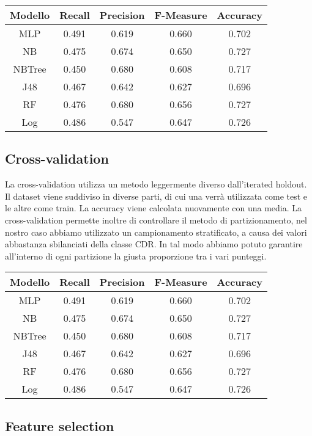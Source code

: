 \begin{table}[H]
\tabcolsep=0.10cm
\small
\begin{tabular}{ccccc}

     Modello & Recall & Precision & F-Measure & Accuracy  \\
     \hline
     MLP & 0.491 & 0.619 & 0.660 & 0.702 \\
     NB & 0.475 & 0.674 & 0.650 & 0.727 \\
     NBTree & 0.450 & 0.680 & 0.608 & 0.717 \\
     J48 & 0.467 & 0.642 & 0.627 & 0.696 \\
     RF & 0.476 & 0.680 & 0.656 & 0.727 \\
     Log & 0.486 & 0.547 & 0.647 & 0.726 \\
     \hline
\end{tabular}
\end{table}


\subsection{Cross-validation}
La cross-validation utilizza un metodo leggermente diverso dall'iterated holdout. Il dataset viene suddiviso in diverse parti, di cui una verrà utilizzata come test e le altre come train. La accuracy viene calcolata nuovamente con una media.
La cross-validation permette inoltre di controllare il metodo di partizionamento, nel nostro caso abbiamo utilizzato un campionamento stratificato, a causa dei valori abbastanza sbilanciati della classe CDR. In tal modo abbiamo potuto garantire all'interno di ogni partizione la giusta proporzione tra i vari punteggi.

\begin{table}[H]
\tabcolsep=0.10cm
\small
\begin{tabular}{c c c c c}
     Modello & Recall & Precision & F-Measure & Accuracy  \\
     \hline
     MLP & 0.491 & 0.619 & 0.660 & 0.702 \\
     NB & 0.475 & 0.674 & 0.650 & 0.727 \\
     NBTree & 0.450 & 0.680 & 0.608 & 0.717 \\
     J48 & 0.467 & 0.642 & 0.627 & 0.696 \\
     RF & 0.476 & 0.680 & 0.656 & 0.727 \\
     Log & 0.486 & 0.547 & 0.647 & 0.726 \\
     \hline
\end{tabular}
\end{table}
\subsection{Feature selection}
